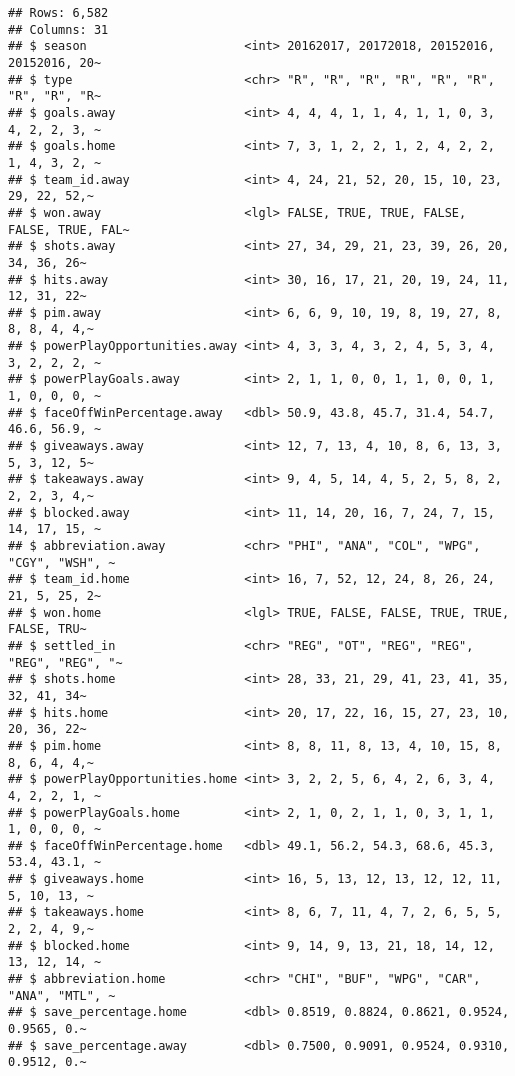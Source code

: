 \documentclass[
]{article}
\begin{document}
\begin{verbatim}
## Rows: 6,582
## Columns: 31
## $ season                      <int> 20162017, 20172018, 20152016, 20152016, 20~
## $ type                        <chr> "R", "R", "R", "R", "R", "R", "R", "R", "R~
## $ goals.away                  <int> 4, 4, 4, 1, 1, 4, 1, 1, 0, 3, 4, 2, 2, 3, ~
## $ goals.home                  <int> 7, 3, 1, 2, 2, 1, 2, 4, 2, 2, 1, 4, 3, 2, ~
## $ team_id.away                <int> 4, 24, 21, 52, 20, 15, 10, 23, 29, 22, 52,~
## $ won.away                    <lgl> FALSE, TRUE, TRUE, FALSE, FALSE, TRUE, FAL~
## $ shots.away                  <int> 27, 34, 29, 21, 23, 39, 26, 20, 34, 36, 26~
## $ hits.away                   <int> 30, 16, 17, 21, 20, 19, 24, 11, 12, 31, 22~
## $ pim.away                    <int> 6, 6, 9, 10, 19, 8, 19, 27, 8, 8, 8, 4, 4,~
## $ powerPlayOpportunities.away <int> 4, 3, 3, 4, 3, 2, 4, 5, 3, 4, 3, 2, 2, 2, ~
## $ powerPlayGoals.away         <int> 2, 1, 1, 0, 0, 1, 1, 0, 0, 1, 1, 0, 0, 0, ~
## $ faceOffWinPercentage.away   <dbl> 50.9, 43.8, 45.7, 31.4, 54.7, 46.6, 56.9, ~
## $ giveaways.away              <int> 12, 7, 13, 4, 10, 8, 6, 13, 3, 5, 3, 12, 5~
## $ takeaways.away              <int> 9, 4, 5, 14, 4, 5, 2, 5, 8, 2, 2, 2, 3, 4,~
## $ blocked.away                <int> 11, 14, 20, 16, 7, 24, 7, 15, 14, 17, 15, ~
## $ abbreviation.away           <chr> "PHI", "ANA", "COL", "WPG", "CGY", "WSH", ~
## $ team_id.home                <int> 16, 7, 52, 12, 24, 8, 26, 24, 21, 5, 25, 2~
## $ won.home                    <lgl> TRUE, FALSE, FALSE, TRUE, TRUE, FALSE, TRU~
## $ settled_in                  <chr> "REG", "OT", "REG", "REG", "REG", "REG", "~
## $ shots.home                  <int> 28, 33, 21, 29, 41, 23, 41, 35, 32, 41, 34~
## $ hits.home                   <int> 20, 17, 22, 16, 15, 27, 23, 10, 20, 36, 22~
## $ pim.home                    <int> 8, 8, 11, 8, 13, 4, 10, 15, 8, 8, 6, 4, 4,~
## $ powerPlayOpportunities.home <int> 3, 2, 2, 5, 6, 4, 2, 6, 3, 4, 4, 2, 2, 1, ~
## $ powerPlayGoals.home         <int> 2, 1, 0, 2, 1, 1, 0, 3, 1, 1, 1, 0, 0, 0, ~
## $ faceOffWinPercentage.home   <dbl> 49.1, 56.2, 54.3, 68.6, 45.3, 53.4, 43.1, ~
## $ giveaways.home              <int> 16, 5, 13, 12, 13, 12, 12, 11, 5, 10, 13, ~
## $ takeaways.home              <int> 8, 6, 7, 11, 4, 7, 2, 6, 5, 5, 2, 2, 4, 9,~
## $ blocked.home                <int> 9, 14, 9, 13, 21, 18, 14, 12, 13, 12, 14, ~
## $ abbreviation.home           <chr> "CHI", "BUF", "WPG", "CAR", "ANA", "MTL", ~
## $ save_percentage.home        <dbl> 0.8519, 0.8824, 0.8621, 0.9524, 0.9565, 0.~
## $ save_percentage.away        <dbl> 0.7500, 0.9091, 0.9524, 0.9310, 0.9512, 0.~
\end{verbatim}
\end{document}
